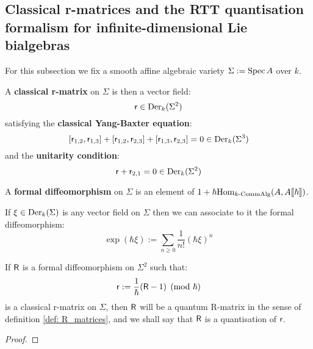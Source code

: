     \subsection{Classical r-matrices and the RTT quantisation formalism for infinite-dimensional Lie bialgebras}
        \begin{convention}
            For this subsection we fix a smooth affine algebraic variety $\Sigma : = \operatorname{Spec} A$ over $k$.
        \end{convention}
    
        \begin{definition} \label{def: classical_r_matrices}
            A \textbf{classical r-matrix} on $\Sigma$ is then a vector field:
                $$\mathsf{r} \in \mathrm{Der}_k(\Sigma^2)$$
            satisfying the \textbf{classical Yang-Baxter equation}:
                $$[\mathsf{r}_{1, 2}, \mathsf{r}_{1, 3}] + [\mathsf{r}_{1, 2}, \mathsf{r}_{2, 3}] + [\mathsf{r}_{1, 3}, \mathsf{r}_{2, 3}] = 0 \in \mathrm{Der}_k(\Sigma^3)$$
            and the \textbf{unitarity condition}:
                $$\mathsf{r} + \mathsf{r}_{2, 1} = 0 \in \mathrm{Der}_k(\Sigma^2)$$
        \end{definition}

        \begin{definition} \label{def: formal_diffeomorphisms}
            A \textbf{formal diffeomorphism} on $\Sigma$ is an element of $1 + \hbar \mathrm{Hom}_{k\text{-}\mathrm{Comm}\mathrm{Alg}}(A, A[\![\hbar]\!])$.
        \end{definition}
        \begin{example}
            If $\xi \in \mathrm{Der}_k(\Sigma)$ is any vector field on $\Sigma$ then we can associate to it the formal diffeomorphism:
                $$\exp(\hbar \xi) := \sum_{n \geq 0} \frac{1}{n!} (\hbar \xi)^n$$
        \end{example}
        \begin{proposition}
            If $\mathsf{R}$ is a formal diffeomorphism on $\Sigma^2$ such that:
                $$\mathsf{r} := \frac{1}{\hbar}(\mathsf{R} - 1) \pmod{\hbar}$$
            is a classical r-matrix on $\Sigma$, then $\mathsf{R}$ will be a quantum R-matrix in the sense of definition \ref{def: R_matrices}, and we shall say that $\mathsf{R}$ is a quantisation of $\mathsf{r}$. 
        \end{proposition}
            \begin{proof}
                
            \end{proof}
            
        \begin{example}
            
        \end{example}

        \begin{example} \label{example: affine_QUEs}

        \end{example}

        \begin{example} \label{example: toroidal_QUEs}

        \end{example}
